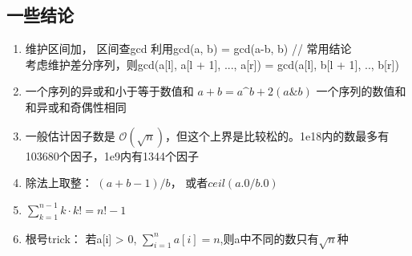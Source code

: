 \documentclass[a4paper]{ctexart}
\begin{document}
\subsection{一些结论}

\begin{enumerate}
	\item 维护区间加， 区间查gcd
	利用gcd(a, b) = gcd(a-b, b)  // 常用结论 \\
	考虑维护差分序列，则gcd(a[l], a[l + 1], ..., a[r]) = gcd(a[l], b[l + 1], .., b[r])
	\item
	  \subitem 一个序列的异或和小于等于数值和 $a+b=a \^ b+2(a \& b)$
	  \subitem 一个序列的数值和和异或和奇偶性相同

	\item 一般估计因子数是 $\mathcal{O}(\sqrt{n})$，但这个上界是比较松的。1e18内的数最多有103680个因子，1e9内有1344个因子

	\item 除法上取整： $(a + b - 1) / b$， 或者$ceil(a.0 / b.0)$
	\item $\sum_{k=1}^{n-1}{k \cdot k!} = n! - 1$
	\item 根号trick：
	若a[i] > 0, $\sum_{i=1}^{n} a[i] = n$,则a中不同的数只有$\sqrt{n}$种
		
\end{enumerate}
\end{document}
